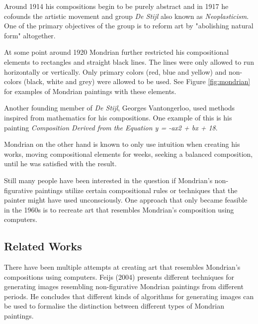 \documentclass[serif,article,noparskip]{agse-thesis}
\begin{document}
Around 1914 his compositions begin to be purely abstract and in 1917 he cofounds
the artistic movement and group \textit{De Stijl} also known as
\textit{Neoplasticism}. One of the primary objectives of the group is to reform
art by "abolishing natural form" \cite{wiki:manifest} altogether.

At some point around 1920 Mondrian further restricted his compositional elements
to rectangles and straight black lines. The lines were only allowed to run
horizontally or vertically. Only primary colors (red, blue and yellow) and
non-colors (black, white and grey) were allowed to be used. See Figure
\ref{fig:mondrian} for examples of Mondrian paintings with these elements.

Another founding member of \textit{De Stijl}, Georges Vantongerloo, used methods
inspired from mathematics for his compositions. One example of this is his
painting \textit{Composition Derived from the Equation y = -ax2 + bx + 18}.

Mondrian on the other hand is known to only use intuition when creating his
works, moving compositional elements for weeks, seeking a balanced composition,
until he was satisfied with the result.

Still many people have been interested in the question if Mondrian's
non-figurative paintings utilize certain compositional rules or techniques that
the painter might have used unconsciously. One approach that only became
feasible in the 1960s is to recreate art that resembles Mondrian's composition
using computers.

\subsection{Related Works}

There have been multiple attempts at creating art that resembles Mondrian's
compositions using computers. Feijs (2004) \cite{Feijs2004} presents different
techniques for generating images resembling non-figurative Mondrian paintings
from different periods. He concludes that different kinds of algorithms for
generating images can be used to formalise the distinction between different
types of Mondrian paintings.
\end{document}

